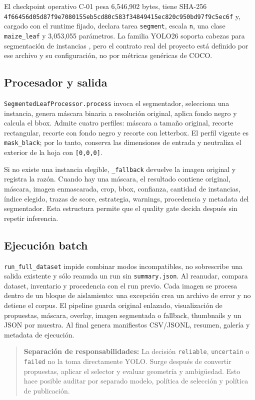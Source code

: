 \documentclass[11pt,a4paper]{article}
\begin{document}
El checkpoint operativo C-01 pesa 6,546,902 bytes, tiene SHA-256 \texttt{4f66456d05d87f9e7080155eb5cd80c583f34849415ec820c950bd97f9c5ec6f} y, cargado con el runtime fijado, declara tarea \texttt{segment}, escala \texttt{n}, una clase \texttt{maize\_leaf} y 3,053,055 parámetros. La familia YOLO26 soporta cabezas para segmentación de instancias \citep{jocher2026yolo26}, pero el contrato real del proyecto está definido por ese archivo y su configuración, no por métricas genéricas de COCO.


\subsection{Procesador y salida}

\texttt{SegmentedLeafProcessor.process} invoca el segmentador, selecciona una instancia, genera máscara binaria a resolución original, aplica fondo negro y calcula el bbox. Admite cuatro perfiles: máscara a tamaño original, recorte rectangular, recorte con fondo negro y recorte con letterbox. El perfil vigente es \texttt{mask\_black}; por lo tanto, conserva las dimensiones de entrada y neutraliza el exterior de la hoja con \texttt{[0,0,0]}.


Si no existe una instancia elegible, \texttt{\_fallback} devuelve la imagen original y registra la razón. Cuando hay una máscara, el resultado contiene original, máscara, imagen enmascarada, crop, bbox, confianza, cantidad de instancias, índice elegido, trazas de score, estrategia, warnings, procedencia y metadata del segmentador. Esta estructura permite que el quality gate decida después sin repetir inferencia.


\subsection{Ejecución batch}

\texttt{run\_full\_dataset} impide combinar modos incompatibles, no sobrescribe una salida existente y sólo reanuda un run sin \texttt{summary.json}. Al reanudar, compara dataset, inventario y procedencia con el run previo. Cada imagen se procesa dentro de un bloque de aislamiento: una excepción crea un archivo de error y no detiene el corpus. El pipeline guarda original enlazado, visualización de propuestas, máscara, overlay, imagen segmentada o fallback, thumbnails y un JSON por muestra. Al final genera manifiestos CSV/JSONL, resumen, galería y metadata de ejecución.


\begin{quote}\textbf{Separación de responsabilidades:} La decisión \texttt{reliable}, \texttt{uncertain} o \texttt{failed} no la toma directamente YOLO. Surge después de convertir propuestas, aplicar el selector y evaluar geometría y ambigüedad. Esto hace posible auditar por separado modelo, política de selección y política de publicación.\end{quote}
\end{document}
